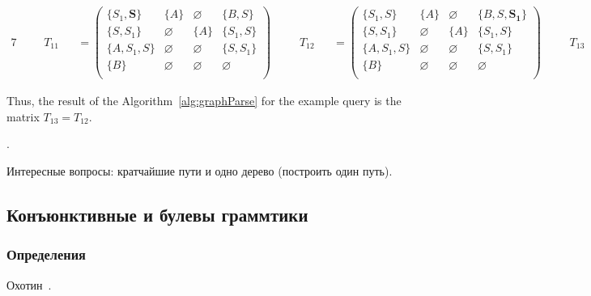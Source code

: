 \begin{example}
\begin{alignat*}{7}
& &&T_{11} &&= \begin{pmatrix}
\{S_1, \pmb{S}\}     & \{A\}       & \varnothing & \{B, S\}    \\
\{S, S_1\}       & \varnothing & \{A\}       & \{S_1, S\}     \\
\{A, S_1, S\}  & \varnothing & \varnothing & \{S, S_1\} \\
\{B\}       & \varnothing & \varnothing & \varnothing \\
\end{pmatrix} \ \ \ \ &&T_{12} &&= \begin{pmatrix}
\{S_1, S\}     & \{A\}       & \varnothing & \{B, S, \pmb{S_1}\}    \\
\{S, S_1\}       & \varnothing & \{A\}       & \{S_1, S\}     \\
\{A, S_1, S\}  & \varnothing & \varnothing & \{S, S_1\} \\
\{B\}       & \varnothing & \varnothing & \varnothing \\
\end{pmatrix} \ \ \ \ &&T_{13} &&= \begin{pmatrix}
\{S_1, S\}     & \{A\}       & \varnothing & \{B, S, S_1\}    \\
\{S, S_1\}       & \varnothing & \{A\}       & \{S_1, S\}     \\
\{A, S_1, S\}  & \varnothing & \varnothing & \{S, S_1\} \\
\{B\}       & \varnothing & \varnothing & \varnothing \\
\end{pmatrix}
\end{alignat*}

Thus, the result of the Algorithm~\ref{alg:graphParse} for the example query is the matrix $T_{13} = T_{12}$. 

\end{example}.

Интересные вопросы: кратчайшие пути и одно дерево (построить один путь).

\subsection{Конъюнктивные и булевы граммтики}

\subsubsection{Определения}

Охотин~\cite{!!!}.

